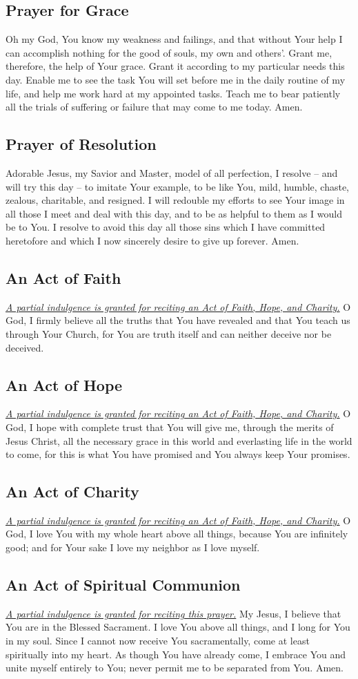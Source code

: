 \documentclass[12pt]{article}
\newcommand{\prayertitle}[1]{\subsection{#1}}
\newcommand{\indulgencedprayertitle}[1]{\prayertitle{#1 \protect\kreuz}}
\newcommand{\note}[1]{{\small{\textsl{#1}}}\newline}
\newcommand{\linkednote}[2]{\hyperlink{#1}{\note{#2}}}
\begin{document}
\prayertitle{Prayer for Grace}
\label{prayer:grace}
Oh my God, You know my weakness and failings, and that without Your help I can accomplish nothing for the good of souls, my own and others'.
Grant me, therefore, the help of Your grace.
Grant it according to my particular needs this day.
Enable me to see the task You will set before me in the daily routine of my life, and help me work hard at my appointed tasks.
Teach me to bear patiently all the trials of suffering or failure that may come to me today. Amen.

\prayertitle{Prayer of Resolution}
\label{prayer:resolution}
Adorable Jesus, my Savior and Master, model of all perfection, I resolve -- and will try this day -- to imitate Your example, to be like You, mild, humble, chaste, zealous, charitable, and resigned.
I will redouble my efforts to see Your image in all those I meet and deal with this day, and to be as helpful to them as I would be to You.
I resolve to avoid this day all those sins which I have committed heretofore and which I now sincerely desire to give up forever. Amen.

\indulgencedprayertitle{An Act of Faith}
\label{prayer:act_of_faith}
\linkednote{grant28}{A partial indulgence is granted for reciting an Act of Faith, Hope, and Charity.}
O God,
I firmly believe all the truths that You have revealed and that You teach us through Your Church, for You are truth itself and can neither deceive nor be deceived.

\indulgencedprayertitle{An Act of Hope}
\linkednote{grant28}{A partial indulgence is granted for reciting an Act of Faith, Hope, and Charity.}
O God,
I hope with complete trust that You will give me, through the merits of Jesus Christ, all the necessary grace in this world and everlasting life in the world to come, for this is what You have promised and You always keep Your promises.

\indulgencedprayertitle{An Act of Charity}
\linkednote{grant28}{A partial indulgence is granted for reciting an Act of Faith, Hope, and Charity.}
O God,
I love You with my whole heart above all things, because You are infinitely good; and for Your sake I love my neighbor as I love myself.

\indulgencedprayertitle{An Act of Spiritual Communion}
\linkednote{grant8}{A partial indulgence is granted for reciting this prayer.}
My Jesus, I believe that You are in the Blessed Sacrament.
I love You above all things, and I long for You in my soul.
Since I cannot now receive You sacramentally, come at least spiritually into my heart.
As though You have already come, I embrace You and unite myself entirely to You;
never permit me to be separated from You.
Amen.
\end{document}
